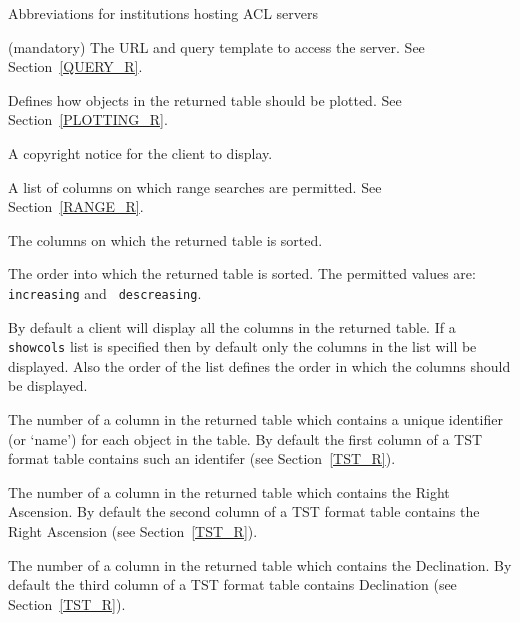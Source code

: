 \documentclass[twoside,11pt]{article}
\renewcommand{\_}{\texttt{\symbol{95}}}
\begin{document}
\begin{description}
\begin{table}[htbp]
\caption{Abbreviations for institutions hosting ACL servers
\label{REMINST} }

\end{table}

  \item[{\tt url}] (mandatory) The URL and query template to access the
   server.  See Section~\ref{QUERY_R}.

  \item[{\tt symbol}] Defines how objects in the returned table should
   be plotted.  See Section~\ref{PLOTTING_R}.

  \item[{\tt copyright}] A copyright notice for the client to display.

  \item[{\tt search\_cols}] A list of columns on which range searches
   are permitted.  See Section~\ref{RANGE_R}.

  \item[{\tt sort\_cols}] The columns on which the returned table is
   sorted.

  \item[{\tt sort\_order}] The order into which the returned table is
   sorted.  The permitted values are: {\tt increasing} and {\tt
   descreasing}.

  \item[{\tt show\_cols}] By default a client will display all the
   columns in the returned table.  If a {\tt show\_cols} list is specified
   then by default only the columns in the list will be displayed.  Also
   the order of the list defines the order in which the columns should be
   displayed.

  \item[{\tt id\_col}] The number of a column in the returned table
   which contains a unique identifier (or `name') for each object in
   the table.  By default the first column of a TST format table contains
   such an identifer (see Section~\ref{TST_R}).

  \item[{\tt ra\_col}] The number of a column in the returned table
   which contains the Right Ascension.  By default the second column of a
   TST format table contains the Right Ascension (see Section~\ref{TST_R}).

  \item[{\tt dec\_col}] The number of a column in the returned table
   which contains the Declination.  By default the third column of a
   TST format table contains Declination (see Section~\ref{TST_R}).


\end{description}
\end{document}
